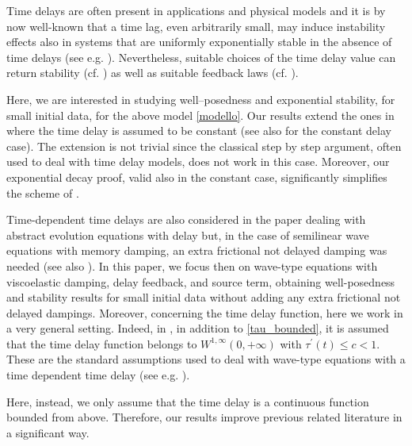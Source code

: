 \documentclass[11pt]{article}
\renewcommand{\le}{\leqslant}
\begin{document}
Time delays are often present in applications and physical models and it is by now well-known that a time lag, even arbitrarily small, may induce instability effects also in systems that are uniformly exponentially stable in the absence of time delays (see e.g. \cite{Datko, NP, XYL}). Nevertheless, suitable choices of the time delay value can return stability (cf. \cite{Gugat, GugatT}) as well as suitable
feedback laws (cf. \cite{NP, XYL}). 

Here, we are interested in studying well--posedness and exponential stability, for small initial data, for the above model \eqref{modello}.
Our results extend the ones in \cite{PP_memory} where the time delay is assumed to be constant (see also \cite{Feng2} for the constant delay case). The extension is not trivial since the classical step by step argument, often used to deal with time delay models, does not work in this case. Moreover, our exponential decay proof, valid also in the constant case, significantly simplifies the scheme of \cite{PP_memory}. 

Time-dependent time delays are also considered in the paper \cite{KP} dealing with abstract evolution equations with delay but, in the case of semilinear wave equations with memory damping,  an extra frictional not delayed damping was needed (see also  \cite{JEE15, JEE18}).  In this paper, we focus then on wave-type equations with viscoelastic damping, delay feedback, and source term,  obtaining well-posedness and stability results for small initial data without adding any extra frictional not delayed dampings.  Moreover, concerning the time delay function, here we work in a very general setting. Indeed, in \cite{KP}, in addition to \eqref{tau_bounded}, it is assumed that the time delay function belongs to
$W^{1,\infty}(0, +\infty)$ with 
$\tau^\prime (t)\le c<1.$ 
These are the standard assumptions used to deal with wave-type equations with  a time dependent time delay (see e.g. \cite{NPV11, ChentoufMansouri, Feng}).

 Here, instead, we only assume that the time delay is a continuous function bounded from above. 
Therefore, our results improve previous related literature in a significant way. 
\end{document}
